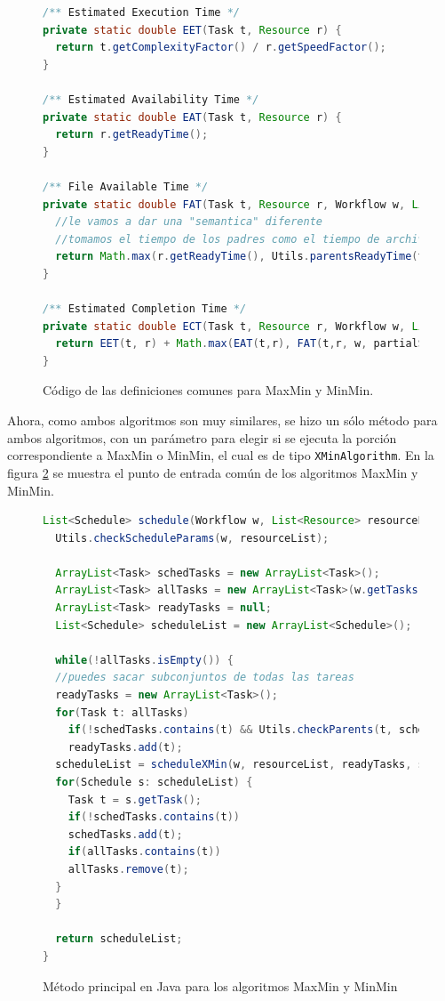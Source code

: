 \begin{figure}
\label{code:xmin_defs}
\begin{lstlisting}[language=java]
/** Estimated Execution Time */
private static double EET(Task t, Resource r) {
  return t.getComplexityFactor() / r.getSpeedFactor();
}

/** Estimated Availability Time */
private static double EAT(Task t, Resource r) {
  return r.getReadyTime();
}

/** File Available Time */
private static double FAT(Task t, Resource r, Workflow w, List<Schedule> partialSchedule) {
  //le vamos a dar una "semantica" diferente
  //tomamos el tiempo de los padres como el tiempo de archivos listo
  return Math.max(r.getReadyTime(), Utils.parentsReadyTime(t, partialSchedule, w));
}

/** Estimated Completion Time */
private static double ECT(Task t, Resource r, Workflow w, List<Schedule> partialSchedule) {
  return EET(t, r) + Math.max(EAT(t,r), FAT(t,r, w, partialSchedule));
}
\end{lstlisting}
\caption{Código de las definiciones comunes para MaxMin y MinMin.}
\end{figure}


Ahora, como ambos algoritmos son muy similares, se hizo un sólo método para ambos algoritmos, con un parámetro para elegir si se ejecuta la porción correspondiente a MaxMin o MinMin, el cual es de tipo \texttt{XMinAlgorithm}. En la figura \ref{code:xmin_main} se muestra el punto de entrada común de los algoritmos MaxMin y MinMin.

\begin{figure}
\label{code:xmin_main}
\begin{lstlisting}[language=java]
List<Schedule> schedule(Workflow w, List<Resource> resourceList, XMinAlgorithm algorithm) {
  Utils.checkScheduleParams(w, resourceList);

  ArrayList<Task> schedTasks = new ArrayList<Task>();
  ArrayList<Task> allTasks = new ArrayList<Task>(w.getTasks());
  ArrayList<Task> readyTasks = null;
  List<Schedule> scheduleList = new ArrayList<Schedule>();

  while(!allTasks.isEmpty()) {
  //puedes sacar subconjuntos de todas las tareas
  readyTasks = new ArrayList<Task>();
  for(Task t: allTasks)
    if(!schedTasks.contains(t) && Utils.checkParents(t, schedTasks, w))
    readyTasks.add(t);
  scheduleList = scheduleXMin(w, resourceList, readyTasks, scheduleList, algorithm);
  for(Schedule s: scheduleList) {
    Task t = s.getTask();
    if(!schedTasks.contains(t))
    schedTasks.add(t);
    if(allTasks.contains(t))
    allTasks.remove(t);
  }
  }

  return scheduleList;
}
\end{lstlisting}
\caption{Método principal en Java para los algoritmos MaxMin y MinMin}
\end{figure}

